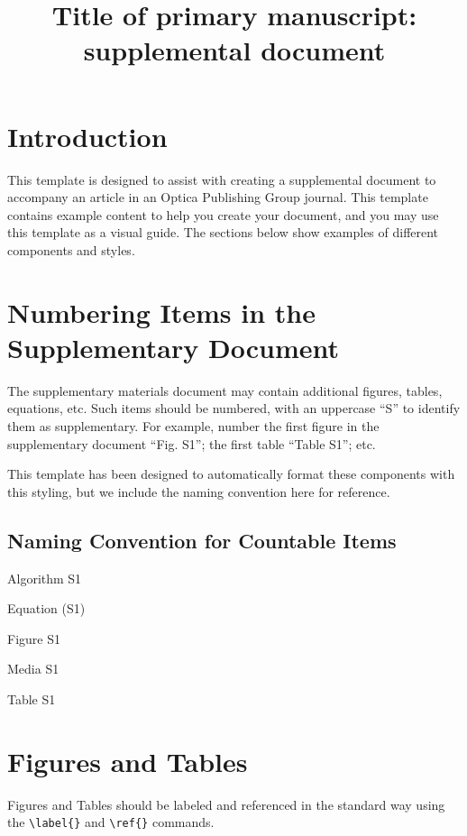 \documentclass[9pt]{osa-supplemental-document}
\title{Title of primary manuscript: supplemental document}
\author{} %
\begin{document}
\maketitle

\section{Introduction}

This template is designed to assist with creating a supplemental document to accompany an article in an Optica Publishing Group journal. This template contains example content to help you create your document, and you may use this template as a visual guide. The sections below show examples of different components and styles.


\section{Numbering Items in the Supplementary Document}

The supplementary materials document may contain additional figures, tables, equations, etc. Such items should be numbered, with an uppercase “S” to identify them as supplementary. For example, number the first figure in the supplementary document “Fig. S1”; the first table “Table S1”; etc.

This template has been designed to automatically format these components with this styling, but we include the naming convention here for reference.

\subsection*{Naming Convention for Countable Items}

\begin{condenseditemize}
\item[] Algorithm S1
\item[] Equation (S1)
\item[] Figure S1
\item[] Media S1
\item[] Table S1
\end{condenseditemize}


\section{Figures and Tables}
Figures and Tables should be labeled and referenced in the standard way using the \verb|\label{}| and \verb|\ref{}| commands.
\end{document}
